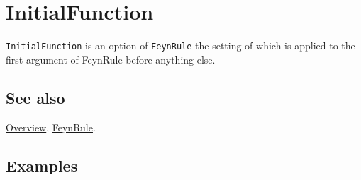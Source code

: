 \documentclass[../FeynCalcManual.tex]{subfiles}
\begin{document}
\hypertarget{initialfunction}{
\section{InitialFunction}\label{initialfunction}}

\texttt{InitialFunction} is an option of \texttt{FeynRule} the setting
of which is applied to the first argument of FeynRule before anything
else.

\subsection{See also}

\hyperlink{toc}{Overview}, \hyperlink{feynrule}{FeynRule}.

\subsection{Examples}
\end{document}
